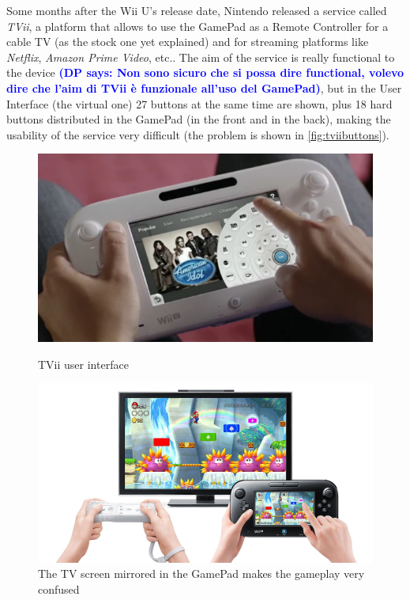 \documentclass[11pt,a4paper,titlepage]{article}
\newcommand{\DP}[1]{\textcolor{blue}{\textbf{(DP says: #1)}}}
\begin{document}
			Some months after the Wii U's release date, Nintendo released a service called \textit{TVii}, a platform that allows to use the GamePad as a Remote Controller for a cable TV (as the stock one yet explained) and for streaming platforms like \textit{Netflix}, \textit{Amazon Prime Video}, etc..
			The aim of the service is really functional to the device \DP{Non sono sicuro che si possa dire functional, volevo dire che l'aim di TVii è funzionale all'uso del GamePad}, but in the User Interface (the virtual one) 27 buttons at the same time are shown, plus 18 hard buttons distributed in the GamePad (in the front and in the back), making the usability of the service very difficult (the problem is shown in \autoref{fig:tviibuttons}).
			\begin{figure}[htbp]
				\begin{minipage}{.5\textwidth}
					\includegraphics[width=\textwidth]{TViibuttons.png}
					\caption{TVii user interface}
					\label{fig:tviibuttons}
				\end{minipage}
				\begin{minipage}{.5\textwidth}
					\includegraphics[width=\textwidth]{mariobrosu.jpeg}
					\caption{The TV screen mirrored in the GamePad makes the gameplay very confused}
					\label{fig:mariobros_u}
				\end{minipage}
			\end{figure}
\end{document}
